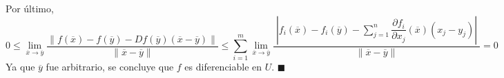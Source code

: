 \documentclass[fleqn]{article}
\begin{document}
    Por último, 
    \begin{equation*}
        0 \leq \lim_{\overline{x} \to \overline{y}} \dfrac{ \left\lVert f(\overline{x}) - f(\overline{y}) - Df(\overline{y}) \left( \overline{x} - \overline{y} \right) \right\rVert }{ \left\lVert \overline{x} - \overline{y} \right\rVert } \leq \sum_{i=1}^{m} \lim_{\overline{x} \to \overline{y}} \dfrac{ \phantom{|} \left\lvert f_i(\overline{x}) - f_i(\overline{y}) - \displaystyle \sum_{j=1}^{n} \dfrac{\partial f_i}{\partial x_j} (\overline{x}) \left( x_j - y_j \right) \right\rvert \phantom{|}}{ \left\lVert \overline{x} - \overline{y} \right\rVert } = 0
    \end{equation*}
    Ya que $ \overline{y} $ fue arbitrario, se concluye que $ f $ es diferenciable en $ U $. \hfill $ \blacksquare $
\end{document}
